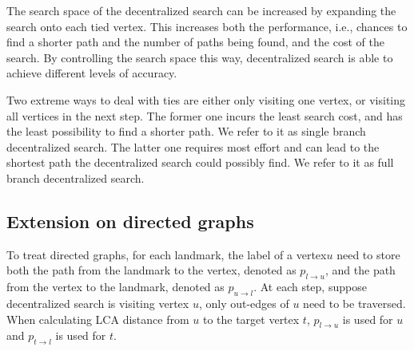The search space of the decentralized search can be increased by expanding the search onto each tied vertex. This increases both the performance, i.e., chances to find a shorter path and the number of paths being found, and the cost of the search. By controlling the search space this way, decentralized search is able to achieve different levels of accuracy.

Two extreme ways to deal with ties are either only visiting one vertex, or visiting all vertices in the next step. The former one incurs the least search cost, and has the least possibility to find a shorter path. We refer to it as single branch decentralized search. The latter one requires most effort and can lead to the shortest path the decentralized search could possibly find. We refer to it as full branch decentralized search.

\subsection{Extension on directed graphs}
To treat directed graphs, for each landmark, the label of a vertex$u$ need to store both the path from the landmark to the vertex, denoted as $p_{l \rightarrow u}$, and the path from the vertex to the landmark, denoted as $p_{u \rightarrow l}$. At each step, suppose decentralized search is visiting vertex $u$, only out-edges of $u$ need to be traversed. When calculating LCA distance from $u$ to the target vertex $t$, $p_{l \rightarrow u}$ is used for $u$ and $p_{t \rightarrow l}$ is used for $t$.
